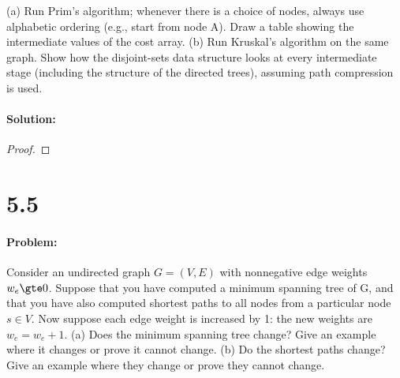 \documentclass[12pt]{article}
\begin{document}
(a) Run Prim’s algorithm; whenever there is a choice of nodes, always use alphabetic ordering
(e.g., start from node A). Draw a table showing the intermediate values of the cost array.
(b) Run Kruskal’s algorithm on the same graph. Show how the disjoint-sets data structure
looks at every intermediate stage (including the structure of the directed trees), assuming
path compression is used.

\paragraph{Solution:}
\begin{proof}
\end{proof}


\section{5.5}
\paragraph{Problem:}

Consider an undirected graph $G = (V, E)$ with nonnegative edge weights $w_e \gte 0$. Suppose that
you have computed a minimum spanning tree of G, and that you have also computed shortest
paths to all nodes from a particular node $s ∈ V$.
Now suppose each edge weight is increased by 1: the new weights are $w_e = w_e + 1$.
(a) Does the minimum spanning tree change? Give an example where it changes or prove it
cannot change.
(b) Do the shortest paths change? Give an example where they change or prove they cannot
change.
\end{document}
